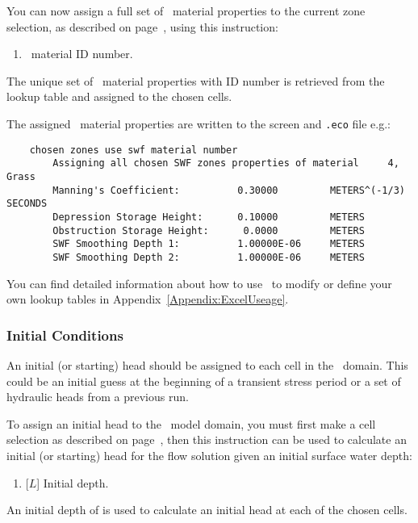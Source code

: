 You can now assign a full set of \swf\ material properties to the current zone selection, as described on page~\pageref{page:zoneSelect}, using this instruction:

    {
        \squish
        \begin{enumerate}
        \item {}  \swf\ material ID number.
        \end{enumerate}
        The unique set of \swf\ material properties with ID number  is retrieved from the lookup table and assigned to the chosen cells.    }

The assigned \swf\ material properties are written to the screen and \texttt{.eco} file e.g.:
\begin{verbatim}
    chosen zones use swf material number
    	Assigning all chosen SWF zones properties of material     4, Grass
    	Manning's Coefficient:          0.30000         METERS^(-1/3)  SECONDS
    	Depression Storage Height:      0.10000         METERS
    	Obstruction Storage Height:      0.0000         METERS
    	SWF Smoothing Depth 1:          1.00000E-06     METERS
    	SWF Smoothing Depth 2:          1.00000E-06     METERS
\end{verbatim}

You can find detailed information about how to use \excel\ to modify or define your own lookup tables in Appendix~\ref{Appendix:ExcelUseage}.

\subsubsection{Initial Conditions}  
An initial (or starting) head should be assigned to each cell in the \swf\ domain.  This could be an initial guess at the beginning of a transient stress period or a set of hydraulic heads from a previous run.

To assign an initial head to the \swf\ model domain, you must first make a cell selection as described on page~\pageref{page:cellSelect}, then this instruction can be used to calculate an initial (or starting) head for the flow solution given an initial surface water depth:

    {
        \squish
        \begin{enumerate}
        \item {} [$L$]  Initial depth.
        \end{enumerate}
          An initial depth of  is used to calculate an initial head at each of the chosen cells.
    }

